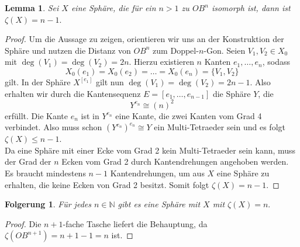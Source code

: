 \documentclass[12pt,titlepage,twoside,cleardoublepage]{article}
\theoremstyle{nummermitklammern}
\newtheorem{lemma}[temp]{Lemma}
\newtheorem{folgerung}[temp]{Folgerung}
\newtheorem{lemma}[zahl]{Lemma}
\newtheorem{folgerung}[zahl]{Folgerung}
\numberwithin{equation}{section}
\begin{document}
\begin{lemma}
Sei $X$ eine Sphäre, die für ein $n>1$ zu $OB^n$ isomorph ist, dann ist $\zeta(X)=n-1.$
\end{lemma}
\begin{proof}
Um die Aussage zu zeigen, orientieren wir uns an der Konstruktion der Sphäre und nutzen die Distanz von $OB^n$ zum Doppel-$n$-Gon. Seien $V_1,V_2\in X_0$ mit $\deg(V_1)=\deg(V_2)=2n$. Hierzu existieren $n$ Kanten $e_1,\ldots,e_n$, sodass 
\[
X_0(e_1)=X_0(e_2)=\ldots=X_0(e_n)=\{V_1,V_2\}
\] gilt.
In der Sphäre $X^{[e_1]}$ gilt nun $\deg(V_1)=\deg(V_2)=2n-1$. Also erhalten wir durch die Kantensequenz $E=[e_1,\ldots,e_{n-1}]$ die Sphäre $Y$, die 
\[
Y^{e_n}\cong (n)^2
\] erfüllt. Die Kante $e_n$ ist in $Y^{e_n}$ eine Kante, die zwei Kanten vom Grad 4 verbindet. Also muss schon ${(Y^{e_n})}^{e_n}\cong Y$ ein Multi-Tetraeder sein und
 es folgt $\zeta(X)\leq n-1$. \\
Da eine Sphäre mit einer Ecke vom Grad 2 kein Multi-Tetraeder sein kann, muss der Grad der $n$ Ecken vom Grad 2 durch Kantendrehungen angehoben werden. Es braucht mindestens $n-1$ Kantendrehungen, um aus $X$ eine Sphäre zu erhalten, die keine Ecken von Grad 2 besitzt. Somit folgt $\zeta(X)=n-1.$
\end{proof}
\begin{folgerung}
Für jedes $n \in \mathbb{N}$ gibt es eine Sphäre mit $X$ mit $\zeta(X)=n.$
\end{folgerung}
\begin{proof}
Die $n+1$-fache Tasche liefert die Behauptung, da $\zeta(OB^{n+1})=n+1-1=n$ ist.
\end{proof}
\end{document}
